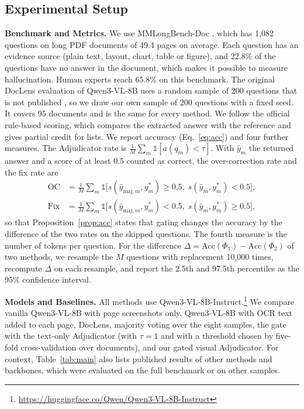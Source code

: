 \documentclass[conference]{IEEEtran}
\begin{document}
\subsection{Experimental Setup}
\label{sec:setup}
\textbf{Benchmark and Metrics.} We use MMLongBench-Doc \cite{ma2024mmlongbench}, which has 1,082 questions on long PDF documents of 49.4 pages on average. Each question has an evidence source (plain text, layout, chart, table or figure), and 22.8\% of the questions have no answer in the document, which makes it possible to measure hallucination. Human experts reach 65.8\% on this benchmark. The original DocLens evaluation of Qwen3-VL-8B uses a random sample of 200 questions that is not published \cite{zhu2025doclens}, so we draw our own sample of 200 questions with a fixed seed. It covers 95 documents and is the same for every method. We follow the official rule-based scoring, which compares the extracted answer with the reference and gives partial credit for lists. We report accuracy (Eq.~\eqref{eq:acc}) and four further measures. The Adjudicator rate is $\frac{1}{M}\sum_m\mathbb{1}[a(q_m)<\tau]$. With $\hat y_m$ the returned answer and a score of at least 0.5 counted as correct, the over-correction rate and the fix rate are
\begin{equation}
\begin{aligned}
\mathrm{OC}&=\tfrac{1}{M}\textstyle\sum_m\mathbb{1}\bigl[s(\hat y_{\mathrm{maj},m},y^\ast_m)\ge0.5,\; s(\hat y_m,y^\ast_m)<0.5\bigr],\\
\mathrm{Fix}&=\tfrac{1}{M}\textstyle\sum_m\mathbb{1}\bigl[s(\hat y_{\mathrm{maj},m},y^\ast_m)<0.5,\; s(\hat y_m,y^\ast_m)\ge0.5\bigr],
\end{aligned}
\label{eq:ocfix}
\end{equation}
so that Proposition~\ref{prop:acc} states that gating changes the accuracy by the difference of the two rates on the skipped questions. The fourth measure is the number of tokens per question. For the difference $\Delta=\mathrm{Acc}(\Phi_1)-\mathrm{Acc}(\Phi_2)$ of two methods, we resample the $M$ questions with replacement 10,000 times, recompute $\Delta$ on each resample, and report the 2.5th and 97.5th percentiles as the 95\% confidence interval.

\textbf{Models and Baselines.} All methods use Qwen3-VL-8B-Instruct.\footnote{\url{https://huggingface.co/Qwen/Qwen3-VL-8B-Instruct}} We compare vanilla Qwen3-VL-8B with page screenshots only, Qwen3-VL-8B with OCR text added to each page, DocLens, majority voting over the eight samples, the gate with the text-only Adjudicator (with $\tau=1$ and with a threshold chosen by five-fold cross-validation over documents), and our gated visual Adjudicator. For context, Table~\ref{tab:main} also lists published results of other methods and backbones, which were evaluated on the full benchmark or on other samples.
\end{document}
